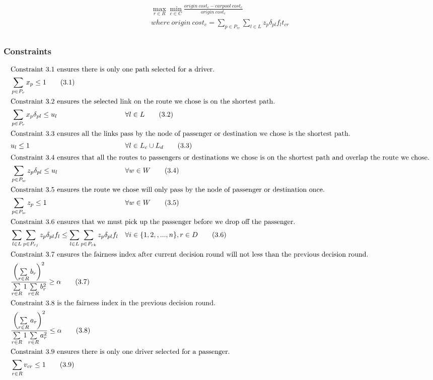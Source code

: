 \begin{align*}
  \max_{r \in R} \min_{c \in C} \frac{origin\ cost_c - carpool\ cost_c}{origin\ cost_c} \tag{IP1} \\
  where\ origin\ cost_c = \sum_{p \in P_{rc}} \sum_{l \in L} z_p \delta_{pl} f_l t_{cr} \\
\end{align*}

\subsubsection*{Constraints}

\begin{align*}
  \intertext{Constraint 3.1 ensures there is only one path selected for a driver.}
  & \sum\limits_{p \in P_r} x_p \leq 1 \tag{3.1} \\
  \intertext{Constraint 3.2 ensures the selected link on the route we chose is on the shortest path.}
  & \sum\limits_{p \in P_r} x_p \delta_{pl} \leq u_l && \forall l \in L \tag{3.2} \\
  \intertext{Constraint 3.3 ensures all the links pass by the node of passenger or destination we chose is the shortest path.}
  & u_l \leq 1 && \forall l \in L_c \cup L_d \tag{3.3} \\
  \intertext{Constraint 3.4 ensures that all the routes to passengers or destinations we chose is on the shortest path and overlap the route we chose.}
  & \sum\limits_{p \in P_w} z_p \delta_{pl} \leq u_l && \forall w \in W \tag{3.4} \\
  \intertext{Constraint 3.5 ensures the route we chose will only pass by the node of passenger or destination once.}
  & \sum\limits_{p \in P_w} z_p \leq 1 && \forall w \in W \tag{3.5} \\
  \intertext{Constraint 3.6 ensures that we must pick up the passenger before we drop off the passenger.}
  & \sum\limits_{l \in L} \sum\limits_{p \in P_{rj}} z_p \delta_{pl} f_l \leq \sum\limits_{l \in L} \sum\limits_{p \in P_{rk}} z_p \delta_{pl} f_l && \forall i \in \{1,2,,...,n\}, r \in D \tag{3.6} \\
  \intertext{Constraint 3.7 ensures the fairness index after current decision round will not less than the previous decision round.}
  & \frac{\left(\sum\limits_{r \in R} b_r\right)^2}{\sum\limits_{r \in R} 1 \sum\limits_{r \in R} b_r^2} \geq \alpha \tag{3.7} \\
  \intertext{Constraint 3.8 is the fairness index in the previous decision round.}
  & \frac{\left(\sum\limits_{r \in R} a_r\right)^2}{\sum\limits_{r \in R} 1 \sum\limits_{r \in R} a_r^2} \leq \alpha \tag{3.8} \\
  \intertext{Constraint 3.9 ensures there is only one driver selected for a passenger.}
  & \sum\limits_{r \in R} v_{cr} \leq 1 \tag{3.9} \\
\end{align*}